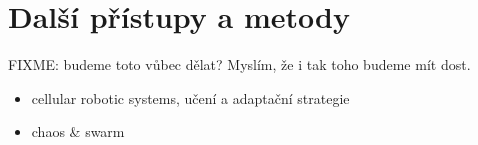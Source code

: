 \documentclass[a4paper,12pt]{article}
\let\stdsection\section
\renewcommand\section{\newpage\stdsection}
\begin{document}
\section{Další přístupy a metody}
FIXME: budeme toto vůbec dělat? Myslím, že i tak toho budeme mít dost.
\begin{itemize}
  \item cellular robotic systems, učení a adaptační strategie
  \item chaos \& swarm
\end{itemize}



\renewcommand{\refname}{\section{Použitá literatura}}


\end{document}
